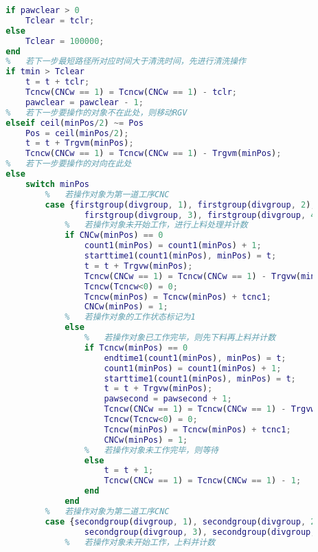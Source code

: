 \documentclass[no-math,withoutpreface,bwprint]{cumcmthesis} %
\numberwithin{equation}{section}
\numberwithin{figure}{section}
\numberwithin{table}{section}
\begin{document}
\begin{lstlisting}[language=matlab]
        %   若机械爪上有待清洗的熟料，计算清洗时间
        if pawclear > 0
            Tclear = tclr;
        else
            Tclear = 100000;
        end
        %   若下一步最短路径所对应时间大于清洗时间，先进行清洗操作
        if tmin > Tclear
            t = t + tclr;
            Tcncw(CNCw == 1) = Tcncw(CNCw == 1) - tclr;
            pawclear = pawclear - 1;
        %   若下一步要操作的对象不在此处，则移动RGV
        elseif ceil(minPos/2) ~= Pos
            Pos = ceil(minPos/2);
            t = t + Trgvm(minPos);
            Tcncw(CNCw == 1) = Tcncw(CNCw == 1) - Trgvm(minPos);
        %   若下一步要操作的对向在此处
        else
            switch minPos
                %   若操作对象为第一道工序CNC
                case {firstgroup(divgroup, 1), firstgroup(divgroup, 2), ...
                        firstgroup(divgroup, 3), firstgroup(divgroup, 4)}
                    %   若操作对象未开始工作，进行上料处理并计数
                    if CNCw(minPos) == 0
                        count1(minPos) = count1(minPos) + 1;
                        starttime1(count1(minPos), minPos) = t;
                        t = t + Trgvw(minPos);
                        Tcncw(CNCw == 1) = Tcncw(CNCw == 1) - Trgvw(minPos);
                        Tcncw(Tcncw<0) = 0;
                        Tcncw(minPos) = Tcncw(minPos) + tcnc1;
                        CNCw(minPos) = 1;
                    %   若操作对象的工作状态标记为1
                    else
                        %   若操作对象已工作完毕，则先下料再上料并计数
                        if Tcncw(minPos) == 0
                            endtime1(count1(minPos), minPos) = t;
                            count1(minPos) = count1(minPos) + 1;
                            starttime1(count1(minPos), minPos) = t;
                            t = t + Trgvw(minPos);
                            pawsecond = pawsecond + 1;
                            Tcncw(CNCw == 1) = Tcncw(CNCw == 1) - Trgvw(minPos);
                            Tcncw(Tcncw<0) = 0;
                            Tcncw(minPos) = Tcncw(minPos) + tcnc1;
                            CNCw(minPos) = 1;
                        %   若操作对象未工作完毕，则等待
                        else
                            t = t + 1;
                            Tcncw(CNCw == 1) = Tcncw(CNCw == 1) - 1;
                        end
                    end
                %   若操作对象为第二道工序CNC
                case {secondgroup(divgroup, 1), secondgroup(divgroup, 2), ...
                        secondgroup(divgroup, 3), secondgroup(divgroup, 4)}
                    %   若操作对象未开始工作，上料并计数

\end{lstlisting}
\end{document}
